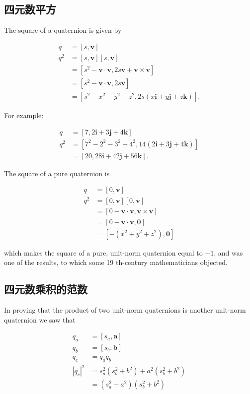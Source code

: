 \subsection{四元数平方}
The square of a quaternion is given by

$$
\begin{aligned}
q & =[s, \mathbf{v}] \\
q^{2} & =[s, \mathbf{v}][s, \mathbf{v}] \\
& =\left[s^{2}-\mathbf{v} \cdot \mathbf{v}, 2 s \mathbf{v}+\mathbf{v} \times \mathbf{v}\right] \\
& =\left[s^{2}-\mathbf{v} \cdot \mathbf{v}, 2 s \mathbf{v}\right] \\
& =\left[s^{2}-x^{2}-y^{2}-z^{2}, 2 s(x \mathbf{i}+y \mathbf{j}+z \mathbf{k})\right] .
\end{aligned}
$$

For example:

$$
\begin{aligned}
q & =[7,2 \mathbf{i}+3 \mathbf{j}+4 \mathbf{k}] \\
q^{2} & =\left[7^{2}-2^{2}-3^{2}-4^{2}, 14(2 \mathbf{i}+3 \mathbf{j}+4 \mathbf{k})\right] \\
& =[20,28 \mathbf{i}+42 \mathbf{j}+56 \mathbf{k}] .
\end{aligned}
$$

The square of a pure quaternion is

$$
\begin{aligned}
q & =[0, \mathbf{v}] \\
q^{2} & =[0, \mathbf{v}][0, \mathbf{v}] \\
& =[0-\mathbf{v} \cdot \mathbf{v}, \mathbf{v} \times \mathbf{v}] \\
& =[0-\mathbf{v} \cdot \mathbf{v}, \mathbf{0}] \\
& =\left[-\left(x^{2}+y^{2}+z^{2}\right), \mathbf{0}\right]
\end{aligned}
$$

which makes the square of a pure, unit-norm quaternion equal to $-1$, and was one of the results, to which some 19 th-century mathematicians objected.

\subsection{四元数乘积的范数}
In proving that the product of two unit-norm quaternions is another unit-norm quaternion we saw that

$$
\begin{aligned}
q_{a} & =\left[s_{a}, \mathbf{a}\right] \\
q_{b} & =\left[s_{b}, \mathbf{b}\right] \\
q_{c} & =q_{a} q_{b} \\
\left|q_{c}\right|^{2} & =s_{a}^{2}\left(s_{b}^{2}+b^{2}\right)+a^{2}\left(s_{b}^{2}+b^{2}\right) \\
& =\left(s_{a}^{2}+a^{2}\right)\left(s_{b}^{2}+b^{2}\right)
\end{aligned}
$$


